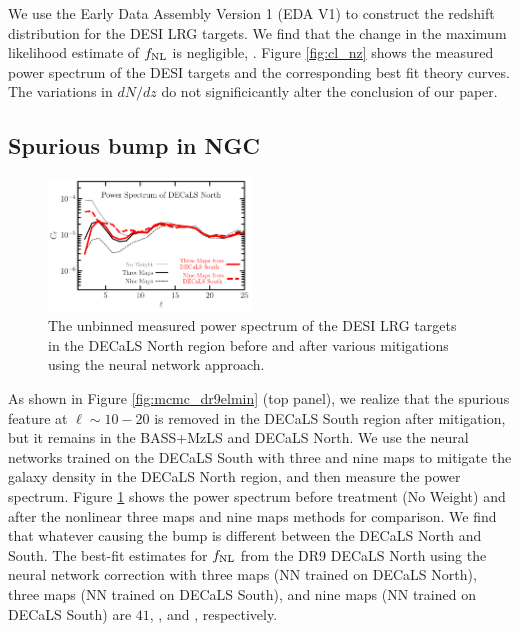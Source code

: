 We use the Early Data Assembly Version 1 (EDA V1) to construct the redshift distribution for the DESI LRG targets. We find that the change in the maximum likelihood estimate of $f_{\rm NL}$ is negligible, . Figure \ref{fig:cl_nz} shows the measured power spectrum of the DESI targets and the corresponding best fit theory curves. The variations in $dN/dz$ do not significicantly alter the conclusion of our paper.

\subsection{Spurious bump in NGC}\label{ssec:ndecalsbump}

\begin{figure}
    \centering
    \includegraphics[width=0.48\textwidth]{figures/cl_SonN.pdf}
    \caption{The unbinned measured power spectrum of the DESI LRG targets in the DECaLS North region before and after various mitigations using the neural network approach.}
    \label{fig:clSonN}
\end{figure}

As shown in Figure \ref{fig:mcmc_dr9elmin} (top panel), we realize that the spurious feature at $\ell \sim 10-20$ is removed in the DECaLS South region after mitigation, but it remains in the BASS+MzLS and DECaLS North. We use the neural networks trained on the DECaLS South with three and nine maps to mitigate the galaxy density in the DECaLS North region, and then measure the power spectrum. Figure \ref{fig:clSonN} shows the power spectrum before treatment (No Weight) and after the nonlinear three maps and nine maps methods for comparison. We find that whatever causing the bump is different between the DECaLS North and South. The best-fit estimates for $f_{\rm NL}$ from the DR9 DECaLS North using the neural network correction with three maps (NN trained on DECaLS North), three maps (NN trained on DECaLS South), and nine maps (NN trained on DECaLS South) are $41$, , and , respectively. 


